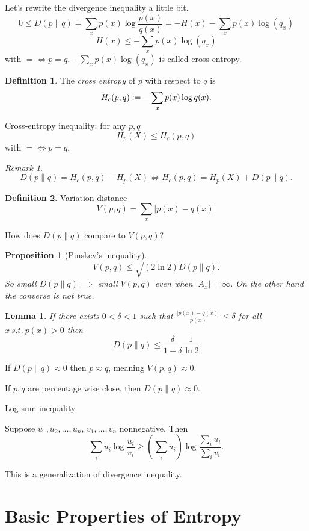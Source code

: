 \documentclass{report}
\newcommand{\st}{\ s.t.\ }
\newcommand{\defeq}{\vcentcolon=}
\newtheorem{lemma}{Lemma}[section]
\newtheorem{proposition}{Proposition}[section]
\theoremstyle{definition}
\newtheorem{definition}{Definition}[section]
\theoremstyle{remark}
\newtheorem*{remark}{Remark}
\numberwithin{equation}{section}
\begin{document}
Let's rewrite the divergence inequality a little bit.
\[
  0 \leq D(p \| q) = \sum_{x} p(x) \log \frac{p(x)}{q(x)} = -H(x) - \sum_x p(x) \log(q_x)  
\]
\[
  H(x) \leq - \sum_x p(x) \log(q_x)  
\] with $= \iff p = q$.
$- \sum_x p(x) \log(q_x) $ is called cross entropy. 
\begin{definition}
  The \emph{cross entropy} of $p$ with respect to $q$ is \[H_c(p, q) \defeq -\sum_x p(x) \log q(x).\]
\end{definition}

Cross-entropy inequality: for any $p, q$ \[
  H_p(X) \leq H_c(p, q)  
\] with $= \iff p = q$.

\begin{remark}
  \[
    D(p \| q) = H_c(p, q) - H_p(X) \iff H_c(p, q) = H_p(X) + D(p \| q).
  \]
\end{remark}

\begin{definition}
  Variation distance \[
    V(p, q) = \sum_x |p(x) - q(x)|  
  \]
\end{definition}
How does $D(p \| q)$ compare to $V(p, q)$?

\begin{proposition}[Pinskev's inequality]
  \[
    V(p, q) \leq \sqrt{(2 \ln 2)D(p \| q)}.
  \]
  So small $D(p \| q) \implies$ small $V(p,q)$ even when $|A_x| = \infty$. On the other hand the converse is not true.
\end{proposition}

\begin{lemma}
  If there exists $0 < \delta < 1$ such that $\frac{|p(x) - q(x)|}{p(x)} \leq \delta$ for all $x \st p(x) > 0$ then \[
    D(p \| q) \leq \frac{\delta}{1 - \delta}\frac{1}{\ln 2}  
  \]
\end{lemma}
If $D(p \| q) \approx 0$ then $p \approx q$, meaning $V(p, q) \approx 0$. 

If $p, q$ are percentage wise close, then $D(p \| q) \approx 0$.

Log-sum inequality

Suppose $u_1, u_2, \ldots, u_n$, $v_1, \ldots, v_n$ nonnegative. Then \[\sum_i u_i \log \frac{u_i}{v_i} \geq \left(\sum_i u_i\right)\log \frac{\sum_i u_i}{\sum_i v_i}.\]

This is a generalization of divergence inequality.


\section{Basic Properties of Entropy}
\end{document}
